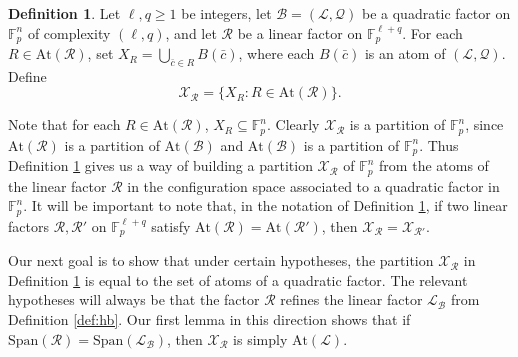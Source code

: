 \documentclass[12pt,oneside,british,a4wide]{amsart}
\numberwithin{equation}{section}
\theoremstyle{definition}
\newtheorem{definition}[theorem]{Definition}
\def\F{\mathbb{F}}
\newcommand{\cbar}{\bar{c}}
\newcommand{\calL}{\mathcal{L}}
\newcommand{\calB}{\mathcal{B}}
\newcommand{\calQ}{\mathcal{Q}}
\newcommand{\calR}{\mathcal{R}}
\newcommand{\calX}{\mathcal{X}}
\newcommand{\Span}{{\mathrm{Span}}}
\newcommand{\At}{{\mathrm{At}}}
\begin{document}
\begin{definition}\label{def:pullback}
Let $\ell,q\geq 1$ be integers, let  $\calB=(\calL,\calQ)$ be a quadratic factor on $\F_p^n$ of complexity $(\ell,q)$, and let $\calR$ be a linear factor on $\F_p^{\ell+q}$.  For each $R\in \At(\calR)$, set $X_{R}=\bigcup_{\cbar\in R}B(\cbar)$, where each $B(\cbar)$ is an atom of $(\calL,\calQ)$.  Define
 $$
 \calX_{\calR}=\{X_{R}: R\in \At(\calR)\}.
 $$
\end{definition}
Note that for each $R\in \At(\calR)$, $X_{R}\subseteq \F_p^n$.  Clearly $\calX_{\calR}$ is a partition of $\F_p^n$, since $\At(\calR)$ is a partition of $\At(\calB)$ and $\At(\calB)$ is a partition of $\F_p^n$.  Thus Definition \ref{def:pullback} gives us a way of building a partition $\calX_{\calR}$ of $\F_p^n$ from the atoms of the linear factor $\calR$ in the configuration space associated to a quadratic factor in $\F_p^n$.   It will be important to note that, in the notation of Definition \ref{def:pullback}, if two linear factors $\calR,\calR'$ on $\F_p^{\ell+q}$ satisfy $\At(\calR)=\At(\calR')$, then $\calX_{\calR}=\calX_{\calR'}$.
 

Our next goal is to show that under certain hypotheses, the partition $\calX_{\calR}$ in Definition \ref{def:pullback} is equal to the set of atoms of a quadratic factor.  The relevant hypotheses will always be that the factor $\calR$ refines the linear factor $\calL_{\calB}$ from Definition \ref{def:hb}.  Our first lemma in this direction shows that if $\Span(\calR)=\Span(\calL_{\calB})$, then $\calX_{\calR}$ is simply $\At(\calL)$.
\end{document}
